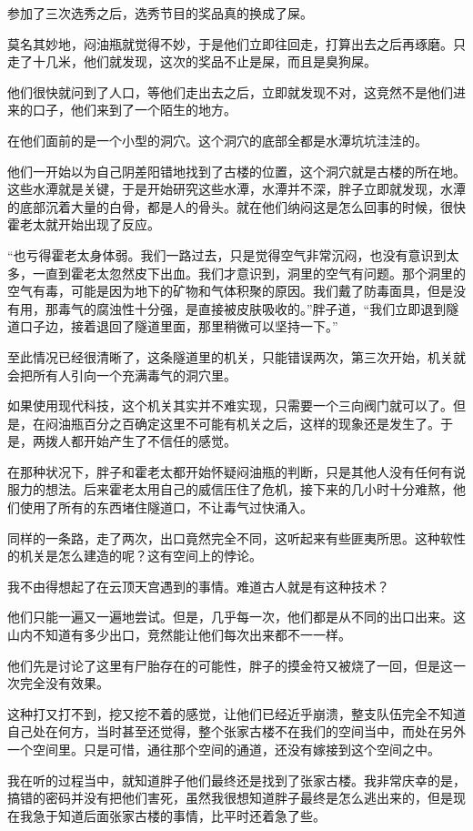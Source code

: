 参加了三次选秀之后，选秀节目的奖品真的换成了屎。

莫名其妙地，闷油瓶就觉得不妙，于是他们立即往回走，打算出去之后再琢磨。只走了十几米，他们就发现，这次的奖品不止是屎，而且是臭狗屎。

他们很快就问到了人口，等他们走出去之后，立即就发现不对，这竞然不是他们进来的口子，他们来到了一个陌生的地方。

在他们面前的是一个小型的洞穴。这个洞穴的底部全都是水潭坑坑洼洼的。

他们一开始以为自己阴差阳错地找到了古楼的位置，这个洞穴就是古楼的所在地。这些水潭就是关键，于是开始研究这些水潭，水潭并不深，胖子立即就发现，水潭的底部沉着大量的白骨，都是人的骨头。就在他们纳闷这是怎么回事的时候，很快霍老太就开始出现了反应。

“也亏得霍老太身体弱。我们一路过去，只是觉得空气非常沉闷，也没有意识到太多，一直到霍老太忽然皮下出血。我们才意识到，洞里的空气有问题。那个洞里的空气有毒，可能是因为地下的矿物和气体积聚的原因。我们戴了防毒面具，但是没有用，那毒气的腐浊性十分强，是直接被皮肤吸收的。”胖子道，“我们立即退到隧道口子边，接着退回了隧道里面，那里稍微可以坚持一下。”

至此情况已经很清晰了，这条隧道里的机关，只能错误两次，第三次开始，机关就会把所有人引向一个充满毒气的洞穴里。

如果使用现代科技，这个机关其实并不难实现，只需要一个三向阀门就可以了。但是，在闷油瓶百分之百确定这里不可能有机关之后，这样的现象还是发生了。于是，两拨人都开始产生了不信任的感觉。

在那种状况下，胖子和霍老太都开始怀疑闷油瓶的判断，只是其他人没有任何有说服力的想法。后来霍老太用自己的威信压住了危机，接下来的几小时十分难熬，他们使用了所有的东西堵住隧道口，不让毒气过快涌入。

同样的一条路，走了两次，出口竟然完全不同，这听起来有些匪夷所思。这种软性的机关是怎么建造的呢？这有空间上的悖论。

我不由得想起了在云顶天宫遇到的事情。难道古人就是有这种技术？

他们只能一遍又一遍地尝试。但是，几乎每一次，他们都是从不同的出口出来。这山内不知道有多少出口，竞然能让他们每次出来都不一一样。

他们先是讨论了这里有尸胎存在的可能性，胖子的摸金符又被烧了一回，但是这一次完全没有效果。

这种打又打不到，挖又挖不着的感觉，让他们已经近乎崩溃，整支队伍完全不知道自己处在何方，当时甚至还觉得，整个张家古楼不在我们的空间当中，而处在另外一个空间里。只是可惜，通往那个空间的通道，还没有嫁接到这个空间之中。

我在听的过程当中，就知道胖子他们最终还是找到了张家古楼。我非常庆幸的是，搞错的密码并没有把他们害死，虽然我很想知道胖子最终是怎么逃出来的，但是现在我急于知道后面张家古楼的事情，比平时还着急了些。

